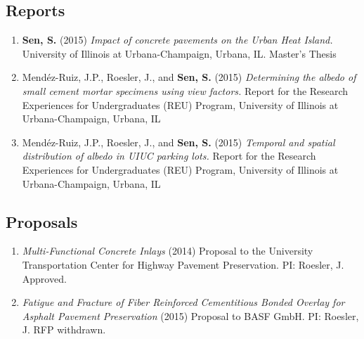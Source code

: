\documentclass[12pt]{article}
\begin{document}
\subsection*{Reports}
\begin{enumerate}[label=(R\arabic*)]
	\item \textbf{Sen, S.} (2015) \textit{Impact of concrete pavements on the Urban Heat Island.} University of Illinois at Urbana-Champaign, Urbana, IL. Master’s Thesis
	\item Mend\'ez-Ruiz, J.P., Roesler, J., and \textbf{Sen, S.} (2015) \textit{Determining the albedo of small cement mortar specimens using view factors.} Report for the Research Experiences for Undergraduates (REU) Program, University of Illinois at Urbana-Champaign, Urbana, IL
	\item Mend\'ez-Ruiz, J.P., Roesler, J., and \textbf{Sen, S.} (2015) \textit{Temporal and spatial distribution of albedo in UIUC parking lots.} Report for the Research Experiences for Undergraduates (REU) Program, University of Illinois at Urbana-Champaign, Urbana, IL
\end{enumerate}

\subsection*{Proposals}
\begin{enumerate}[label=(P\arabic*)]
	\item \textit{Multi-Functional Concrete Inlays} (2014) Proposal to the University Transportation Center for Highway Pavement Preservation. PI: Roesler, J. Approved.
	\item \textit{Fatigue and Fracture of Fiber Reinforced Cementitious Bonded Overlay for Asphalt Pavement Preservation} (2015) Proposal to BASF GmbH. PI: Roesler, J. RFP withdrawn.
\end{enumerate}

\end{document}
